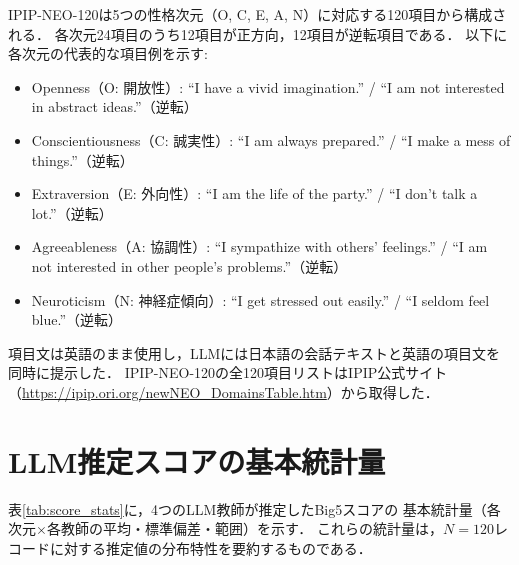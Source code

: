 \documentclass[dvipdfmx,11pt,a4paper]{bxjsarticle}
\renewcommand{\_}{\paperorigunderscore\allowbreak}%
\begin{document}
IPIP-NEO-120は5つの性格次元（O, C, E, A, N）に対応する120項目から構成される．
各次元24項目のうち12項目が正方向，12項目が逆転項目である．
以下に各次元の代表的な項目例を示す:
\begin{itemize}
  \item Openness（O: 開放性）: ``I have a vivid imagination.'' / ``I am not interested in abstract ideas.''（逆転）
  \item Conscientiousness（C: 誠実性）: ``I am always prepared.'' / ``I make a mess of things.''（逆転）
  \item Extraversion（E: 外向性）: ``I am the life of the party.'' / ``I don't talk a lot.''（逆転）
  \item Agreeableness（A: 協調性）: ``I sympathize with others' feelings.'' / ``I am not interested in other people's problems.''（逆転）
  \item Neuroticism（N: 神経症傾向）: ``I get stressed out easily.'' / ``I seldom feel blue.''（逆転）
\end{itemize}

項目文は英語のまま使用し，LLMには日本語の会話テキストと英語の項目文を同時に提示した．
IPIP-NEO-120の全120項目リストはIPIP公式サイト（\url{https://ipip.ori.org/newNEO_DomainsTable.htm}）から取得した．

\section{LLM推定スコアの基本統計量}
\label{sec:appendix_score_stats}

表\ref{tab:score_stats}に，4つのLLM教師が推定したBig5スコアの
基本統計量（各次元$\times$各教師の平均・標準偏差・範囲）を示す．
これらの統計量は，$N = 120$レコードに対する推定値の分布特性を要約するものである．
\end{document}
